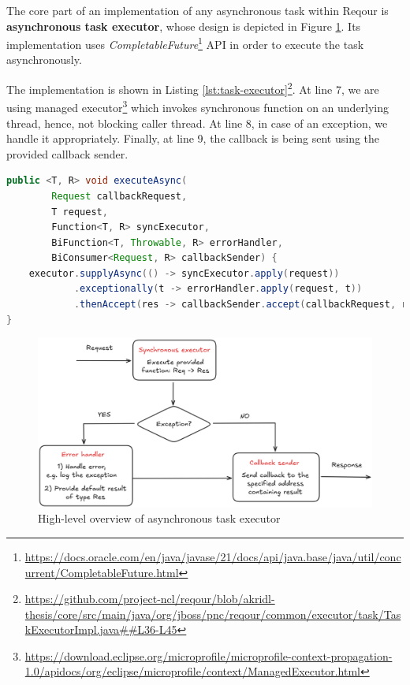 \documentclass[../main.tex]{subfiles}
\begin{document}
The core part of an implementation of any asynchronous task within Reqour is \textbf{asynchronous task executor}, whose design is depicted in Figure \ref{fig:task-executor}. Its implementation uses \textit{CompletableFuture}\footnote{\url{https://docs.oracle.com/en/java/javase/21/docs/api/java.base/java/util/concurrent/CompletableFuture.html}} API in order to execute the task asynchronously.

The implementation is shown in Listing \ref{lst:task-executor}\footnote{\url{https://github.com/project-ncl/reqour/blob/akridl-thesis/core/src/main/java/org/jboss/pnc/reqour/common/executor/task/TaskExecutorImpl.java##L36-L45}}. At line 7, we are using managed executor\footnote{\url{https://download.eclipse.org/microprofile/microprofile-context-propagation-1.0/apidocs/org/eclipse/microprofile/context/ManagedExecutor.html}} which invokes synchronous function on an underlying thread, hence, not blocking caller thread. At line 8, in case of an exception, we handle it appropriately. Finally, at line 9, the callback is being sent using the provided callback sender.

\begin{lstlisting}[language=Java, caption=Asynchronous task executor, label={lst:task-executor}]
public <T, R> void executeAsync(
        Request callbackRequest,
        T request,
        Function<T, R> syncExecutor,
        BiFunction<T, Throwable, R> errorHandler,
        BiConsumer<Request, R> callbackSender) {
    executor.supplyAsync(() -> syncExecutor.apply(request))
            .exceptionally(t -> errorHandler.apply(request, t))
            .thenAccept(res -> callbackSender.accept(callbackRequest, res));
}
\end{lstlisting}

\begin{figure}
  \begin{center}
    \includegraphics[width=\textwidth]{images/task-executor.png}
  \end{center}
  \caption{High-level overview of asynchronous task executor}
  \label{fig:task-executor}
\end{figure}
\end{document}
